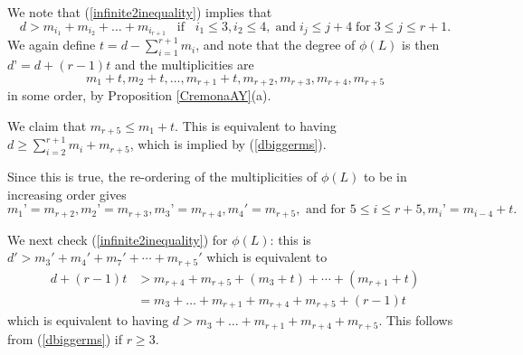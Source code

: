 \documentclass[12pt]{article}
\newtheorem{lemma}[equation]{Lemma}
\numberwithin{equation}{section}
\numberwithin{subeq}{equation}
\begin{document}

\medskip{}
We note that (\ref{infinite2inequality}) implies that
\begin{equation}\label{dbiggerms}
d > m_{i_1}+m_{i_2}+\ldots + m_{i_{r+1}}
\;\;\;\text{if}\;\;\;
i_1 \leq 3, i_2\leq 4, \;\text{and}\; i_j \leq j+4 \;\text{for}\; 3\leq j \leq r+1.
\end{equation}
We again define $t = d-\sum_{i=1}^{r+1}m_i$,
and note that the degree of $\phi(L)$ is then $d’ = d+(r-1)t$
and the multiplicities are 
\[
m_1+t, m_2+t,\ldots,m_{r+1}+t, m_{r+2}, m_{r+3}, m_{r+4}, m_{r+5}
\]
in some order, by Proposition \ref{CremonaAY}(a).

We claim that $m_{r+5} \leq m_1+t$.
This is equivalent to having $d \geq \sum_{i=2}^{r+1}m_i + m_{r+5}$,
which is implied by (\ref{dbiggerms}).

Since this is true, the re-ordering of the multiplicities of $\phi(L)$ to be in increasing order gives
\[
m_1’ = m_{r+2}, m_2’ = m_{r+3}, m_3’ = m_{r+4}, m_4'=m_{r+5},
\text{ and for } 5 \leq i \leq r+5, m_i’ = m_{i-4}+t.
\]

We next check (\ref{infinite2inequality}) for $\phi(L)$: this is
$d' > m_3' + m_4' + m_7' + \cdots + m_{r+5}'$
which is equivalent to
\begin{align*}
d+(r-1)t &>  m_{r+4}+m_{r+5}+(m_3+t)+\cdots+(m_{r+1}+t) \\
&= m_3+\ldots +m_{r+1}+m_{r+4}+m_{r+5} +(r-1)t
\end{align*}
which is equivalent to having $d>m_3+\ldots+m_{r+1}+m_{r+4}+m_{r+5}$.
This follows from (\ref{dbiggerms}) if $r \geq 3$.
\end{document}
